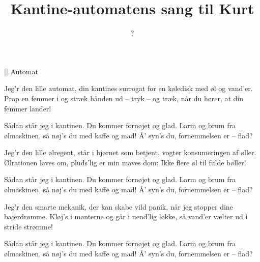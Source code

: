 \documentclass[a4paper,11pt]{article}
\title{Kantine-automatens sang til Kurt}
\author{?}
\begin{document}
\maketitle

\begin{roles}
[] Automat
\end{roles}

\begin{song}
 Jeg'r den lille automat,
          din kantines surrogat
          for en køledisk med øl og vand'er.
          Prop en femmer i og stræk
          hånden ud -- tryk -- og træk,
          når du hører, at din femmer lander!

 Sådan står jeg i kantinen.
          Du kommer fornøjet og glad.
          Larm og brum fra ølmaskinen,
          så nøj's du med kaffe og mad!
          Å' syn's du, fornemmelsen er -- flad?

 Jeg'r den lille ølregent,
          står i hjørnet som betjent,
          vogter konsumeringen af øller.
          Ølrationen laves om,
          pluds'lig er min maves dom:
          Ikke flere øl til fulde bøller!

 Sådan står jeg i kantinen.
          Du kommer fornøjet og glad.
          Larm og brum fra ølmaskinen,
          så nøj's du med kaffe og mad!
          Å' syn's du, fornemmelsen er -- flad?

 Jeg'r den smarte mekanik,
          der kan skabe vild panik,
          når jeg stopper dine bajerdrømme.
          Kløj's i mønterne og går
          i uend'lig løkke, så
          vand'er vælter ud i stride strømme!

 Sådan står jeg i kantinen.
          Du kommer fornøjet og glad.
          Larm og brum fra ølmaskinen,
          så nøj's du med kaffe og mad!
          Å' syn's du, fornemmelsen er -- flad?

\end{song}
\end{document}
